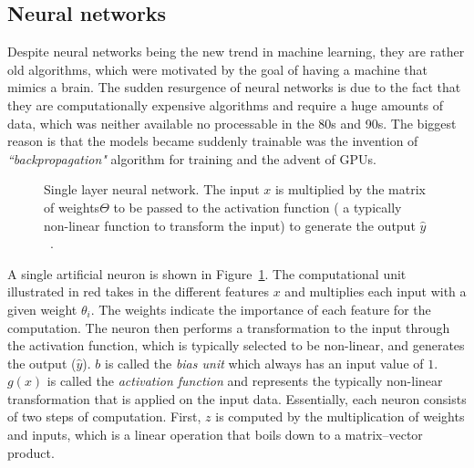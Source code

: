 \subsection{Neural networks}
Despite neural networks being the new trend in machine learning, they are rather old algorithms, which were motivated by the goal of having a machine that mimics a brain. The sudden resurgence of neural networks is due to the fact that they are computationally expensive algorithms and require a huge amounts of data, which was neither available no processable in the 80s and 90s. The biggest reason is that the models became suddenly trainable was the invention of \emph{``backpropagation"} algorithm for training and the advent of GPUs. 
\\
\begin{figure}
\centering 
\resizebox{0.55\textwidth}{0.3\textwidth}{      

}
\caption{Single layer neural network. The input $x$ is multiplied by the matrix of weights$\Theta$ to be passed to the activation function ( a  typically non-linear function to transform the input) to generate the output $\hat { y }$~.
}
\label{fig:preceptron}
\end{figure}
A single artificial neuron is shown in Figure~\ref{fig:preceptron}. The computational unit illustrated in red takes in the different features $x$ and multiplies each input with a given weight $\theta_i$.
The weights indicate the importance of each feature for the computation. The neuron then performs a transformation to the input through the activation function, which is typically selected to be non-linear, and generates the output ($\hat { y } $).
$b$ is called the \emph{bias unit} which always has an input value of $1$. $g(x)$ is called the \emph{activation
function} and represents the typically non-linear transformation that is applied on the input data. Essentially, each neuron consists of two steps of computation. First, $z$ is computed by the multiplication of weights and inputs, which is a linear operation that boils down to a matrix--vector product.
